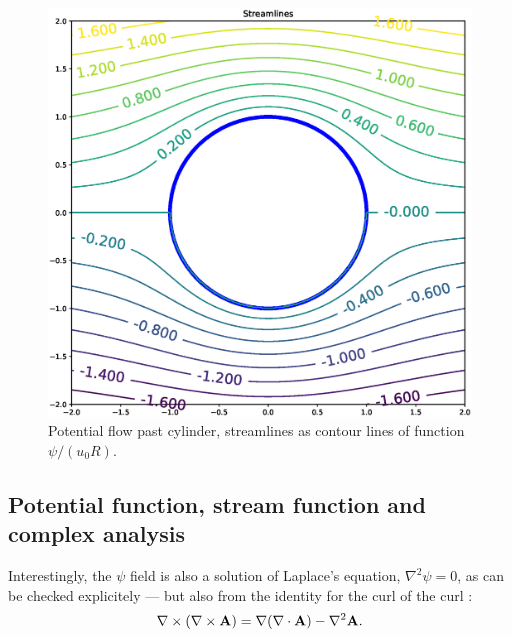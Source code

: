 \begin{figure}
  \centering
  \includegraphics[width=0.6\linewidth]{figures/potential_flow_past_cylinder}
  \caption{Potential flow past cylinder, streamlines
  	as contour lines of function $\psi / (u_0 R)$.
  	\label{fig:potential_flow_past_cylinder}}
\end{figure}






\subsection{Potential function, stream function and complex analysis}

Interestingly, the $\psi$ field is also a solution of Laplace's
equation, $\nabla^2 \psi=0$, as can be checked explicitely --- but
also from the identity for the curl of the curl
\cite{wiki:Vector_calculus_identities}:
\begin{equation}
  \label{eq:curl_of_curl}
  \nabla \times \left(\nabla \times \mathbf{A} \right)=
  \nabla (\nabla \cdot \mathbf {A} )-\nabla^2\mathbf{A} .
\end{equation}

